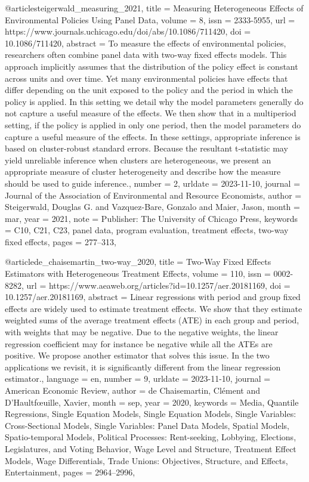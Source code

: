 @article{steigerwald_measuring_2021,
	title = {Measuring {Heterogeneous} {Effects} of {Environmental} {Policies} {Using} {Panel} {Data}},
	volume = {8},
	issn = {2333-5955},
	url = {https://www.journals.uchicago.edu/doi/abs/10.1086/711420},
	doi = {10.1086/711420},
	abstract = {To measure the effects of environmental policies, researchers often combine panel data with two-way fixed effects models. This approach implicitly assumes that the distribution of the policy effect is constant across units and over time. Yet many environmental policies have effects that differ depending on the unit exposed to the policy and the period in which the policy is applied. In this setting we detail why the model parameters generally do not capture a useful measure of the effects. We then show that in a multiperiod setting, if the policy is applied in only one period, then the model parameters do capture a useful measure of the effects. In these settings, appropriate inference is based on cluster-robust standard errors. Because the resultant t-statistic may yield unreliable inference when clusters are heterogeneous, we present an appropriate measure of cluster heterogeneity and describe how the measure should be used to guide inference.},
	number = {2},
	urldate = {2023-11-10},
	journal = {Journal of the Association of Environmental and Resource Economists},
	author = {Steigerwald, Douglas G. and Vazquez-Bare, Gonzalo and Maier, Jason},
	month = mar,
	year = {2021},
	note = {Publisher: The University of Chicago Press},
	keywords = {C10, C21, C23, panel data, program evaluation, treatment effects, two-way fixed effects},
	pages = {277--313},
}

@article{de_chaisemartin_two-way_2020,
	title = {Two-{Way} {Fixed} {Effects} {Estimators} with {Heterogeneous} {Treatment} {Effects}},
	volume = {110},
	issn = {0002-8282},
	url = {https://www.aeaweb.org/articles?id=10.1257/aer.20181169},
	doi = {10.1257/aer.20181169},
	abstract = {Linear regressions with period and group fixed effects are widely used to estimate treatment effects. We show that they estimate weighted sums of the average treatment effects (ATE) in each group and period, with weights that may be negative. Due to the negative weights, the linear regression coefficient may for instance be negative while all the ATEs are positive. We propose another estimator that solves this issue. In the two applications we revisit, it is significantly different from the linear regression estimator.},
	language = {en},
	number = {9},
	urldate = {2023-11-10},
	journal = {American Economic Review},
	author = {de Chaisemartin, Clément and D'Haultfœuille, Xavier},
	month = sep,
	year = {2020},
	keywords = {Media, Quantile Regressions, Single Equation Models, Single Equation Models, Single Variables: Cross-Sectional Models, Single Variables: Panel Data Models, Spatial Models, Spatio-temporal Models, Political Processes: Rent-seeking, Lobbying, Elections, Legislatures, and Voting Behavior, Wage Level and Structure, Treatment Effect Models, Wage Differentials, Trade Unions: Objectives, Structure, and Effects, Entertainment},
	pages = {2964--2996},
}

